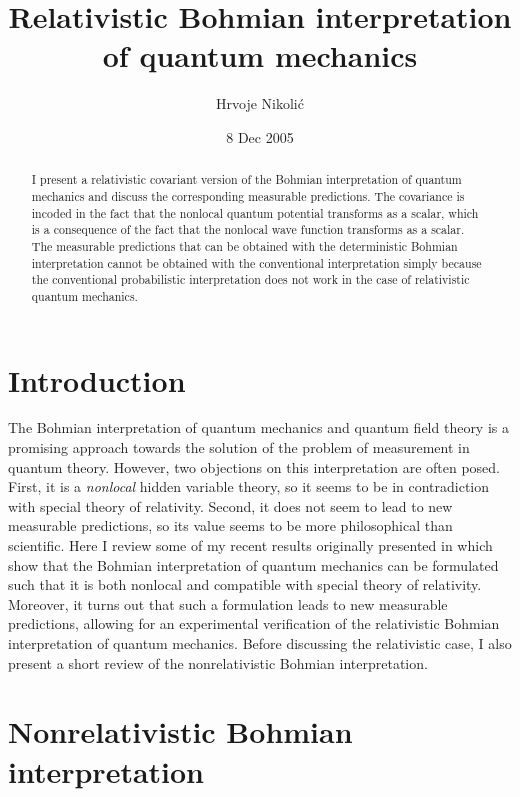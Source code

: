 \documentclass[12pt]{article} %
\begin{document}
\title{Relativistic Bohmian interpretation of quantum mechanics}
\author{Hrvoje Nikoli\'c}
\date{8 Dec 2005}

\maketitle

\begin{abstract}
I present a relativistic covariant version of the Bohmian interpretation of
quantum mechanics and discuss the corresponding measurable predictions.
The covariance is incoded in the fact that the nonlocal quantum potential 
transforms as a scalar, which is a consequence of the fact 
that the nonlocal wave function transforms as a scalar. The  
measurable predictions that can be obtained with the deterministic 
Bohmian interpretation cannot be obtained with the conventional 
interpretation simply because the conventional probabilistic 
interpretation does not work in the case of relativistic 
quantum mechanics.
\end{abstract}

\section{Introduction}

The Bohmian interpretation of quantum mechanics and quantum field theory 
\cite{bohm,bohmPR1,bohmPR2,holPR,holbook} 
is a promising approach towards the solution of the 
problem of measurement in quantum theory. However, two objections 
on this interpretation are often posed. First, it is a {\em nonlocal}
hidden variable theory, so it seems to be in contradiction with
special theory of relativity.
Second, it does not seem to lead to new measurable predictions, so 
its value seems to be more philosophical than scientific. 
Here I review some of my recent results originally presented 
in \cite{nikolfpl1,nikolfpl3} which show 
that the Bohmian interpretation of quantum mechanics 
can be formulated such that 
it is both nonlocal and compatible with special theory of relativity.
Moreover, it turns out that such a formulation leads to 
new measurable predictions, allowing for an experimental 
verification of the relativistic Bohmian interpretation of 
quantum mechanics. Before discussing the relativistic case, 
I also present a short review of the nonrelativistic Bohmian interpretation. 

\section{Nonrelativistic Bohmian interpretation}
\end{document}
